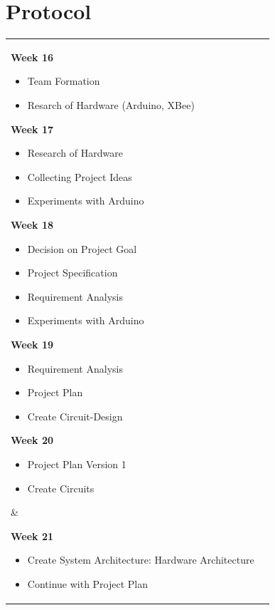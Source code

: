 \documentclass[
	11pt,
	a4paper
]{article}%
\begin{document}
\section{Protocol}
\begin{tabular}{ll}
 \parbox{8cm}{
\large{\textbf{Week 16}}
\begin{itemize}
\item Team Formation
\item Resarch of Hardware (Arduino, XBee)
\end{itemize}
\large{\textbf{Week 17}}
\begin{itemize}
\item Research of Hardware
\item Collecting Project Ideas
\item Experiments with Arduino
\end{itemize}
\large{\textbf{Week 18}}
\begin{itemize}
\item Decision on Project Goal
\item Project Specification
\item Requirement Analysis
\item Experiments with Arduino
\end{itemize}
\large{\textbf{Week 19}}
\begin{itemize}
\item Requirement Analysis
\item Project Plan
\item Create Circuit-Design
\end{itemize}
\large{\textbf{Week 20}}
\begin{itemize}
\item Project Plan Version 1
\item Create Circuits
\end{itemize}
}
 &
 \parbox{8cm}{
\large{\textbf{Week 21}}
\begin{itemize}
\item Create System Architecture: Hardware Architecture
\item Continue with Project Plan

\end{itemize}}
\end{tabular}
\end{document}
